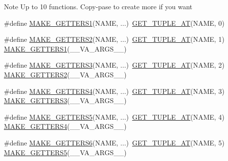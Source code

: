 \begin{DoxyNote}{Note}
Up to 10 functions. Copy-\/pase to create more if you want 
\end{DoxyNote}
\begin{DoxyCompactItemize}
\item 
\#define \hyperlink{group__NamedTupleGroupFuncs_gab605d6cb2b7e9b184dfe30ed51d15fba}{M\+A\+K\+E\+\_\+\+G\+E\+T\+T\+E\+R\+S1}(N\+A\+ME, ...)~\hyperlink{group__NamedTupleGroupFuncs_ga970484fe66e17af41a99b334e59f01d8}{G\+E\+T\+\_\+\+T\+U\+P\+L\+E\+\_\+\+AT}(N\+A\+ME, 0)
\item 
\#define \hyperlink{group__NamedTupleGroupFuncs_ga95890959137a407f0f7d933314e9a6d7}{M\+A\+K\+E\+\_\+\+G\+E\+T\+T\+E\+R\+S2}(N\+A\+ME, ...)~\hyperlink{group__NamedTupleGroupFuncs_ga970484fe66e17af41a99b334e59f01d8}{G\+E\+T\+\_\+\+T\+U\+P\+L\+E\+\_\+\+AT}(N\+A\+ME, 1)  \hyperlink{group__NamedTupleGroupFuncs_gab605d6cb2b7e9b184dfe30ed51d15fba}{M\+A\+K\+E\+\_\+\+G\+E\+T\+T\+E\+R\+S1}(\+\_\+\+\_\+\+V\+A\+\_\+\+A\+R\+G\+S\+\_\+\+\_\+)
\item 
\#define \hyperlink{group__NamedTupleGroupFuncs_ga7ee89faca7d33bdfaa959dce2b451b7f}{M\+A\+K\+E\+\_\+\+G\+E\+T\+T\+E\+R\+S3}(N\+A\+ME, ...)~\hyperlink{group__NamedTupleGroupFuncs_ga970484fe66e17af41a99b334e59f01d8}{G\+E\+T\+\_\+\+T\+U\+P\+L\+E\+\_\+\+AT}(N\+A\+ME, 2)  \hyperlink{group__NamedTupleGroupFuncs_ga95890959137a407f0f7d933314e9a6d7}{M\+A\+K\+E\+\_\+\+G\+E\+T\+T\+E\+R\+S2}(\+\_\+\+\_\+\+V\+A\+\_\+\+A\+R\+G\+S\+\_\+\+\_\+)
\item 
\#define \hyperlink{group__NamedTupleGroupFuncs_ga9481414b78a6c697bd182e423230b41f}{M\+A\+K\+E\+\_\+\+G\+E\+T\+T\+E\+R\+S4}(N\+A\+ME, ...)~\hyperlink{group__NamedTupleGroupFuncs_ga970484fe66e17af41a99b334e59f01d8}{G\+E\+T\+\_\+\+T\+U\+P\+L\+E\+\_\+\+AT}(N\+A\+ME, 3)  \hyperlink{group__NamedTupleGroupFuncs_ga7ee89faca7d33bdfaa959dce2b451b7f}{M\+A\+K\+E\+\_\+\+G\+E\+T\+T\+E\+R\+S3}(\+\_\+\+\_\+\+V\+A\+\_\+\+A\+R\+G\+S\+\_\+\+\_\+)
\item 
\#define \hyperlink{group__NamedTupleGroupFuncs_ga6b170dead1149b1507a612d66ede996a}{M\+A\+K\+E\+\_\+\+G\+E\+T\+T\+E\+R\+S5}(N\+A\+ME, ...)~\hyperlink{group__NamedTupleGroupFuncs_ga970484fe66e17af41a99b334e59f01d8}{G\+E\+T\+\_\+\+T\+U\+P\+L\+E\+\_\+\+AT}(N\+A\+ME, 4)  \hyperlink{group__NamedTupleGroupFuncs_ga9481414b78a6c697bd182e423230b41f}{M\+A\+K\+E\+\_\+\+G\+E\+T\+T\+E\+R\+S4}(\+\_\+\+\_\+\+V\+A\+\_\+\+A\+R\+G\+S\+\_\+\+\_\+)
\item 
\#define \hyperlink{group__NamedTupleGroupFuncs_ga387121cc41c9467e0c55d554cc179eed}{M\+A\+K\+E\+\_\+\+G\+E\+T\+T\+E\+R\+S6}(N\+A\+ME, ...)~\hyperlink{group__NamedTupleGroupFuncs_ga970484fe66e17af41a99b334e59f01d8}{G\+E\+T\+\_\+\+T\+U\+P\+L\+E\+\_\+\+AT}(N\+A\+ME, 5)  \hyperlink{group__NamedTupleGroupFuncs_ga6b170dead1149b1507a612d66ede996a}{M\+A\+K\+E\+\_\+\+G\+E\+T\+T\+E\+R\+S5}(\+\_\+\+\_\+\+V\+A\+\_\+\+A\+R\+G\+S\+\_\+\+\_\+)

\end{DoxyCompactItemize}

